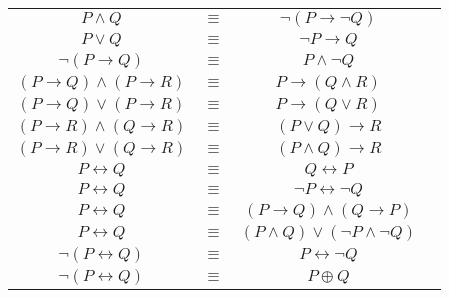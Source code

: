 \documentclass{article}
\begin{document}
\begin{tabularx}{\textwidth}{cccX}
    $P \wedge Q$ & $\equiv$ & $\neg (P \rightarrow \neg Q)$ \\
    $P \vee Q$ & $\equiv$ & $\neg P \rightarrow Q$ \\
    $\neg (P \rightarrow Q)$ & $\equiv$ & $P \wedge \neg Q$ \\
    $(P \rightarrow Q) \wedge (P \rightarrow R)$ & $\equiv$ & $P \rightarrow (Q \wedge R)$ \\
    $(P \rightarrow Q) \vee (P \rightarrow R)$ & $\equiv$ & $P \rightarrow (Q \vee R)$ \\
    $(P \rightarrow R) \wedge (Q \rightarrow R)$ & $\equiv$ & $(P \vee Q) \rightarrow R$ \\
    $(P \rightarrow R) \vee (Q \rightarrow R)$ & $\equiv$ & $(P \wedge Q) \rightarrow R$ \\
    \hline
    $P \leftrightarrow Q$ & $\equiv$ & $Q \leftrightarrow P$ \\
    $P \leftrightarrow Q$ & $\equiv$ & $\neg P \leftrightarrow \neg Q$ \\
    $P \leftrightarrow Q$ & $\equiv$ & $(P \rightarrow Q) \wedge (Q \rightarrow P)$ \\
    $P \leftrightarrow Q$ & $\equiv$ & $(P \wedge Q) \vee (\neg P \wedge \neg Q)$ \\
    $\neg (P \leftrightarrow Q)$ & $\equiv$ & $P \leftrightarrow \neg Q$ \\
    $\neg (P \leftrightarrow Q)$ & $\equiv$ & $P \oplus Q$ \\
\end{tabularx}
\end{document}
